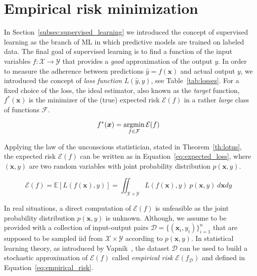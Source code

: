 \section{Empirical risk minimization} \label{sec:erm}
In Section~\ref{subsec:supervised_learning} we introduced the concept of supervised learning as the branch of ML in which predictive models are trained on labeled data. The final goal of supervised learning is to find a function of the input variables $f: \mathcal{X} \rightarrow \mathcal{Y}$ that provides a \textit{good} approximation of the output $y$. In order to measure the adherence between predictions $\hat y = f(\bm{x})$ and actual output $y$, we introduced the concept of \textit{loss function} $L(\hat y, y)$, see Table~\ref{tab:losses}. For a fixed choice of the loss, the ideal estimator, also known as the \textit{target} function, $f^*(\bm{x})$ is the minimizer of the (true) expected risk $\mathcal{E}(f)$ in a rather \textit{large} class of functions $\mathcal{F}$.


\begin{equation} \label{eq:fstar}
	f^*(\bm{x}) = \mathop{\mathrm{argmin}}\limits_{f \in \mathcal{F}}{\mathcal{E}(f)}
\end{equation}

Applying the law of the unconscious statistician, stated in Theorem~\ref{th:lotus}, the expected risk $\mathcal{E}(f)$ can be written as in Equation~\eqref{eq:expected_loss}, where $(\bm{x},y)$ are two random variables with joint probability distribution $p(\bm{x},y)$.

\begin{equation} \label{eq:expected_loss}
	\mathcal{E}(f) = \mathbb{E}[L(f(\bm{x}),y)] = \iint_{\mathcal{X} \times \mathcal{Y}}L(f(\bm{x}),y)~p(\bm{x},y)~d\bm{x}dy
\end{equation}

In real situations, a direct computation of $\mathcal{E}(f)$ is unfeasible as the joint probability distribution $p(\bm{x},y)$ is unknown. Although, we assume to be provided with a collection of input-output pairs $\mathcal{D}=\{(\bm{x}_i,y_i)\}_{i=1}^n$ that are supposed to be sampled \ac{iid} from $\mathcal{X} \times \mathcal{Y}$ according to $p(\bm{x}, y)$.
In statistical learning theory, as introduced by Vapnik~\cite{vapnik2013nature}, the dataset $\mathcal{D}$ can be used to build a stochastic approximation of $\mathcal{E}(f)$ called \textit{empirical risk} $\mathcal{E}(f_{\mathcal{D}})$ and defined in Equation~\eqref{eq:empirical_risk}.

